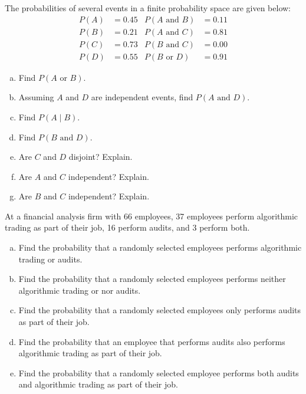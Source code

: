 \documentclass[11pt,letterpaper]{article}
\begin{document}

 The probabilities of several events in a finite probability space are given below:
	\[
	\begin{aligned}
	P(A)&= 0.45 & P(A \text{ and } B)&= 0.11 \\
	P(B)&= 0.21 & P(A \text{ and } C)&= 0.81 \\
	P(C)&= 0.73 & P(B \text{ and } C)&= 0.00 \\
	P(D)&= 0.55 & P(B \text{ or } D)&= 0.91
	\end{aligned}
	\] 
\begin{enumerate}[(a)]
\item Find $P(A \text{ or } B)$. 
\item Assuming $A$ and $D$ are independent events, find $P(A \text{ and } D)$.
\item Find $P(A \;|\; B)$.
\item Find $P(B \text{ and } D)$. 
\item Are $C$ and $D$ disjoint? Explain.
\item Are $A$ and $C$ independent? Explain.
\item Are $B$ and $C$ independent? Explain.
\end{enumerate} \pspace





\newpage





 At a financial analysis firm with 66 employees, 37 employees perform algorithmic trading as part of their job, 16 perform audits, and 3 perform both. 
        \begin{enumerate}[(a)]
        \item Find the probability that a randomly selected employees performs algorithmic trading or audits. 
        \item Find the probability that a randomly selected employees performs neither algorithmic trading or nor audits. 
        \item Find the probability that a randomly selected employees only performs audits as part of their job.
        \item Find the probability that an employee that performs audits also performs algorithmic trading as part of their job. 
        \item Find the probability that a randomly selected employee performs both audits and algorithmic trading as part of their job. 
        \end{enumerate} 
\end{document}
